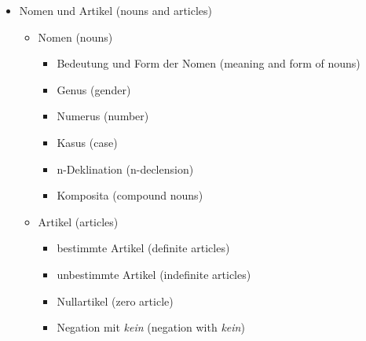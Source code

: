 \documentclass[a4paper]{article}
\begin{document}
\begin{itemize}
\begin{itemize}
                \item Verbale Spezialthemen {\small (special verb topics)}
                \begin{itemize}
                    \item Bedeutung und Funktion von \textit{werden} {\small (meaning and function of \textit{werden})}
                    \item \textit{brauchen} und \textit{sich lassen} {\small (verbs \textit{brauchen} and \textit{sich lassen})}
                    \item Nomen-Verb-Verbindungen {\small (noun-verb combinations)}
                    \begin{itemize}
                        \item freie Nomen-Verb-Verbindungen {\small (free noun-verb combinations)}
                        \item Funktionsverbgefüge {\small (light verb constructions)}
                        \item figurative Nomen-Verb-Verbindungen {\small (figurative noun-verb combinations)}
                    \end{itemize}
                \end{itemize}
            \end{itemize}
            
            \item Nomen und Artikel {\small (nouns and articles)}
            \begin{itemize}
                \item Nomen {\small (nouns)}
                \begin{itemize}
                    \item Bedeutung und Form der Nomen {\small (meaning and form of nouns)}
                    \item Genus {\small (gender)}
                    \item Numerus {\small (number)}
                    \item Kasus {\small (case)}
                    \item n-Deklination {\small (n-declension)}
                    \item Komposita {\small (compound nouns)}
                \end{itemize}
                
                \item Artikel {\small (articles)}
                \begin{itemize}
                    \item bestimmte Artikel {\small (definite articles)}
                    \item unbestimmte Artikel {\small (indefinite articles)}
                    \item Nullartikel {\small (zero article)}
                    \item Negation mit \textit{kein} {\small (negation with \textit{kein})}
                \end{itemize}
            \end{itemize}
            

\end{itemize}
\end{document}
